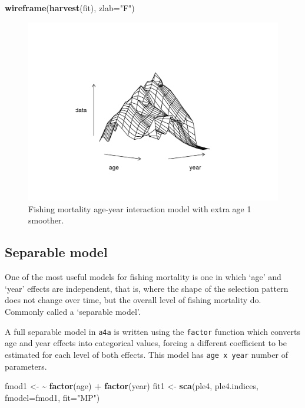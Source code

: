 \documentclass[
]{book}
\newenvironment{Shaded}{\begin{snugshade}}{\end{snugshade}}
\newcommand{\AttributeTok}[1]{\textcolor[rgb]{0.13,0.29,0.53}{#1}}
\newcommand{\ErrorTok}[1]{\textcolor[rgb]{0.64,0.00,0.00}{\textbf{#1}}}
\newcommand{\FunctionTok}[1]{\textcolor[rgb]{0.13,0.29,0.53}{\textbf{#1}}}
\newcommand{\NormalTok}[1]{#1}
\newcommand{\OtherTok}[1]{\textcolor[rgb]{0.56,0.35,0.01}{#1}}
\newcommand{\SpecialCharTok}[1]{\textcolor[rgb]{0.81,0.36,0.00}{\textbf{#1}}}
\newcommand{\StringTok}[1]{\textcolor[rgb]{0.31,0.60,0.02}{#1}}
\begin{document}
\begin{Shaded}
\begin{Highlighting}[]
\FunctionTok{wireframe}\NormalTok{(}\FunctionTok{harvest}\NormalTok{(fit), }\AttributeTok{zlab=}\StringTok{"F"}\NormalTok{)}
\end{Highlighting}
\end{Shaded}

\begin{figure}
\centering
\includegraphics{_bookdown_files/_main_files/figure-html/age1-1.png}
\caption{\label{fig:age1}Fishing mortality age-year interaction model with extra age 1 smoother.}
\end{figure}

\hypertarget{separable-model}{%
\subsection{Separable model}\label{separable-model}}

One of the most useful models for fishing mortality is one in which `age' and `year' effects are independent, that is, where the shape of the selection pattern does not change over time, but the overall level of fishing mortality do. Commonly called a `separable model'.

A full separable model in \texttt{a4a} is written using the \texttt{factor} function which converts age and year effects into categorical values, forcing a different coefficient to be estimated for each level of both effects. This model has \texttt{age\ x\ year} number of parameters.

\begin{Shaded}
\begin{Highlighting}[]
\NormalTok{fmod1 }\OtherTok{\textless{}{-}} \ErrorTok{\textasciitilde{}} \FunctionTok{factor}\NormalTok{(age) }\SpecialCharTok{+} \FunctionTok{factor}\NormalTok{(year)}
\NormalTok{fit1 }\OtherTok{\textless{}{-}} \FunctionTok{sca}\NormalTok{(ple4, ple4.indices, }\AttributeTok{fmodel=}\NormalTok{fmod1, }\AttributeTok{fit=}\StringTok{"MP"}\NormalTok{)}
\end{Highlighting}
\end{Shaded}
\end{document}
